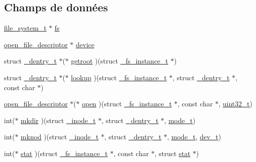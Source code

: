 \subsection*{\-Champs de données}
\begin{DoxyCompactItemize}
\item 
\hyperlink{structfile__system__t}{file\-\_\-system\-\_\-t} $\ast$ \hyperlink{struct__fs__instance__t_a209ef4e2ed00460eead263311373a974}{fs}
\item 
\hyperlink{struct__open__file__descriptor}{open\-\_\-file\-\_\-descriptor} $\ast$ \hyperlink{struct__fs__instance__t_acc3db122838752a84c6ecb93c3644256}{device}
\item 
struct \hyperlink{struct__dentry__t}{\-\_\-dentry\-\_\-t} $\ast$($\ast$ \hyperlink{struct__fs__instance__t_af6891a9d9e5c2fd0458312fd8567213a}{getroot} )(struct \hyperlink{struct__fs__instance__t}{\-\_\-fs\-\_\-instance\-\_\-t} $\ast$)
\item 
struct \hyperlink{struct__dentry__t}{\-\_\-dentry\-\_\-t} $\ast$($\ast$ \hyperlink{struct__fs__instance__t_a820510562ecb31cbbf6b4fc8a4d2ce6a}{lookup} )(struct \hyperlink{struct__fs__instance__t}{\-\_\-fs\-\_\-instance\-\_\-t} $\ast$, struct \hyperlink{struct__dentry__t}{\-\_\-dentry\-\_\-t} $\ast$, const char $\ast$)
\item 
\hyperlink{struct__open__file__descriptor}{open\-\_\-file\-\_\-descriptor} $\ast$($\ast$ \hyperlink{struct__fs__instance__t_a693ff16b5d2119c50abd40a59f62cd66}{open} )(struct \hyperlink{struct__fs__instance__t}{\-\_\-fs\-\_\-instance\-\_\-t} $\ast$, const char $\ast$, \hyperlink{types_8h_a33594304e786b158f3fb30289278f5af}{uint32\-\_\-t})
\item 
int($\ast$ \hyperlink{struct__fs__instance__t_a705d100026840b619f217931dc8419f3}{mkdir} )(struct \hyperlink{struct__inode__t}{\-\_\-inode\-\_\-t} $\ast$, struct \hyperlink{struct__dentry__t}{\-\_\-dentry\-\_\-t} $\ast$, \hyperlink{kstat_8h_af8f4385bb42836d1e3ad4fea9d71d1b9}{mode\-\_\-t})
\item 
int($\ast$ \hyperlink{struct__fs__instance__t_ae57436a3bfd6de530204a67a8ac2f4f0}{mknod} )(struct \hyperlink{struct__inode__t}{\-\_\-inode\-\_\-t} $\ast$, struct \hyperlink{struct__dentry__t}{\-\_\-dentry\-\_\-t} $\ast$, \hyperlink{kstat_8h_af8f4385bb42836d1e3ad4fea9d71d1b9}{mode\-\_\-t}, \hyperlink{kstat_8h_a451f1b5788fa7cc5d33db47a5992e7a6}{dev\-\_\-t})
\item 
int($\ast$ \hyperlink{struct__fs__instance__t_a2c6e81a4cb02717c82587c1995947e56}{stat} )(struct \hyperlink{struct__fs__instance__t}{\-\_\-fs\-\_\-instance\-\_\-t} $\ast$, const char $\ast$, struct \hyperlink{structstat}{stat} $\ast$)

\end{DoxyCompactItemize}
